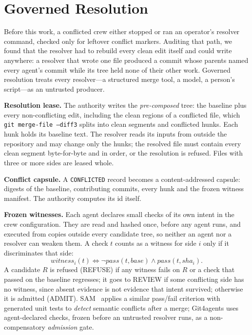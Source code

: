 \documentclass[10pt,conference]{IEEEtran}
\newcommand{\tool}{Git4agents}
\begin{document}
\section{Governed Resolution}\label{sec:resolution}
Before this work, a conflicted crew either stopped or ran an operator's resolver command, checked only for leftover conflict markers. Auditing that path, we found that the resolver had to rebuild every clean edit itself and could write anywhere: a resolver that wrote one file produced a commit whose parents named every agent's commit while its tree held none of their other work. Governed resolution treats every resolver---a structured merge tool, a model, a person's script---as an untrusted producer.

\textbf{Resolution lease.} The authority writes the \emph{pre-composed} tree: the baseline plus every non-conflicting edit, including the clean regions of a conflicted file, which \texttt{git merge-file --diff3} splits into clean segments and conflicted hunks. Each hunk holds its baseline text. The resolver reads its inputs from outside the repository and may change only the hunks; the resolved file must contain every clean segment byte-for-byte and in order, or the resolution is refused. Files with three or more sides are leased whole.

\textbf{Conflict capsule.} A \texttt{CONFLICTED} record becomes a content-addressed capsule: digests of the baseline, contributing commits, every hunk and the frozen witness manifest. The authority computes its id itself.

\textbf{Frozen witnesses.} Each agent declares small checks of its own intent in the crew configuration. They are read and hashed once, before any agent runs, and executed from copies outside every candidate tree, so neither an agent nor a resolver can weaken them. A check $t$ counts as a witness for side $i$ only if it discriminates that side:
\begin{equation}
\mathit{witness}_i(t) \iff \lnot\mathit{pass}(t,\mathit{base}) \land \mathit{pass}(t,\mathit{sha}_i).
\end{equation}
A candidate $R$ is refused (REFUSE) if any witness fails on $R$ or a check that passed on the baseline regresses; it goes to REVIEW if some conflicting side has no witness, since absent evidence is not evidence that intent survived; otherwise it is admitted (ADMIT). SAM~\cite{dasilva2024sam} applies a similar pass/fail criterion with generated unit tests to \emph{detect} semantic conflicts after a merge; \tool{} uses agent-declared checks, frozen before an untrusted resolver runs, as a non-compensatory \emph{admission} gate.
\end{document}
